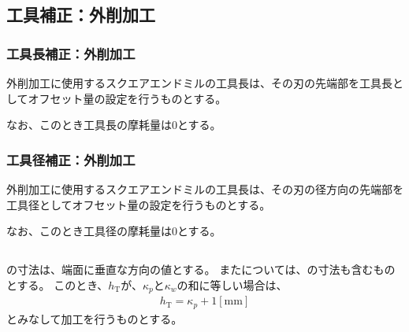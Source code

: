 \subsection{工具補正：外削加工}


\subsubsection{工具長補正：外削加工}
外削加工に使用するスクエアエンドミルの工具長は、その刃の先端部を工具長としてオフセット量の設定を行うものとする。

なお、このとき工具長の摩耗量は0とする。


\subsubsection{工具径補正：外削加工}
外削加工に使用するスクエアエンドミルの工具長は、その刃の径方向の先端部を工具径としてオフセット量の設定を行うものとする。

なお、このとき工具径の摩耗量は0とする。


\subsection{\OutcutLength}
\OutcutLength の寸法は、端面に垂直な方向の値とする。
また\TopOutcutLength については、\KeywayWidth の寸法も含むものとする。
このとき、\TopOutcutLength$h_\mathrm T$が、\KeywayPos$\kappa_p$と\KeywayWidth$\kappa_w$の和に等しい場合は、
\begin{align*}
  h_\mathrm T = \kappa_p+1[\text{mm}]
\end{align*}
とみなして加工を行うものとする。


